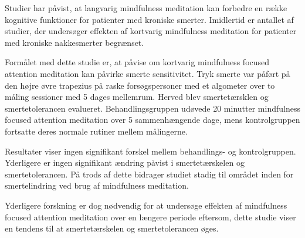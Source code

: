 Studier har påvist, at langvarig mindfulness meditation kan forbedre en række kognitive funktioner for patienter med kroniske smerter. 
Imidlertid er antallet af studier, der undersøger effekten af kortvarig mindfulness meditation for patienter med kroniske nakkesmerter begrænset. 

Formålet med dette studie er, at påvise om kortvarig mindfulness focused attention meditation kan påvirke smerte sensitivitet. Tryk smerte var påført på den højre øvre trapezius på raske forsøgspersoner med et algometer over to måling sessioner med 5 dages mellemrum. Herved blev smertetærsklen og smertetolerancen evalueret. Behandlingsgruppen udøvede 20 minutter mindfulness focused attention meditation over 5 sammenhængende dage, mens kontrolgruppen fortsatte deres normale rutiner mellem målingerne.

Resultater viser ingen signifikant forskel mellem behandlings- og kontrolgruppen. Yderligere er ingen signifikant ændring påvist i smertetærskelen og smertetolerancen. På trods af dette bidrager studiet stadig til området inden for smertelindring ved brug af mindfulness meditation. 

Yderligere forskning er dog nødvendig for at undersøge effekten af mindfulness focused attention meditation over en længere periode eftersom, dette studie viser en tendens til at smertetærskelen og smertetolerancen øges.
